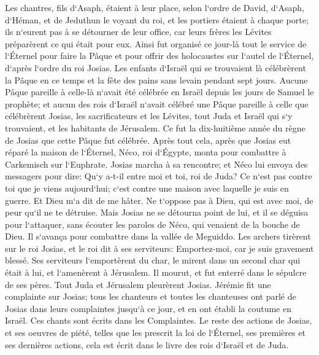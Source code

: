 \verse Les chantres, fils d`Asaph, étaient à leur place, selon l`ordre de David, d`Asaph, d`Héman, et de Jeduthun le voyant du roi, et les portiers étaient à chaque porte; ils n`eurent pas à se détourner de leur office, car leurs frères les Lévites préparèrent ce qui était pour eux. 
\verse Ainsi fut organisé ce jour-là tout le service de l`Éternel pour faire la Pâque et pour offrir des holocaustes sur l`autel de l`Éternel, d`après l`ordre du roi Josias. 
\verse Les enfants d`Israël qui se trouvaient là célébrèrent la Pâque en ce temps et la fête des pains sans levain pendant sept jours. 
\verse Aucune Pâque pareille à celle-là n`avait été célébrée en Israël depuis les jours de Samuel le prophète; et aucun des rois d`Israël n`avait célébré une Pâque pareille à celle que célébrèrent Josias, les sacrificateurs et les Lévites, tout Juda et Israël qui s`y trouvaient, et les habitants de Jérusalem. 
\verse Ce fut la dix-huitième année du règne de Josias que cette Pâque fut célébrée. 
\verse Après tout cela, après que Josias eut réparé la maison de l`Éternel, Néco, roi d`Égypte, monta pour combattre à Carkemisch sur l`Euphrate. Josias marcha à sa rencontre; 
\verse et Néco lui envoya des messagers pour dire: Qu`y a-t-il entre moi et toi, roi de Juda? Ce n`est pas contre toi que je viens aujourd`hui; c`est contre une maison avec laquelle je suis en guerre. Et Dieu m`a dit de me hâter. Ne t`oppose pas à Dieu, qui est avec moi, de peur qu`il ne te détruise. 
\verse Mais Josias ne se détourna point de lui, et il se déguisa pour l`attaquer, sans écouter les paroles de Néco, qui venaient de la bouche de Dieu. Il s`avança pour combattre dans la vallée de Meguiddo. 
\verse Les archers tirèrent sur le roi Josias, et le roi dit à ses serviteurs: Emportez-moi, car je suis gravement blessé. 
\verse Ses serviteurs l`emportèrent du char, le mirent dans un second char qui était à lui, et l`amenèrent à Jérusalem. Il mourut, et fut enterré dans le sépulcre de ses pères. Tout Juda et Jérusalem pleurèrent Josias. 
\verse Jérémie fit une complainte sur Josias; tous les chanteurs et toutes les chanteuses ont parlé de Josias dans leurs complaintes jusqu`à ce jour, et en ont établi la coutume en Israël. Ces chants sont écrits dans les Complaintes. 
\verse Le reste des actions de Josias, et ses oeuvres de piété, telles que les prescrit la loi de l`Éternel, 
\verse ses premières et ses dernières actions, cela est écrit dans le livre des rois d`Israël et de Juda. 

\chapter{}

